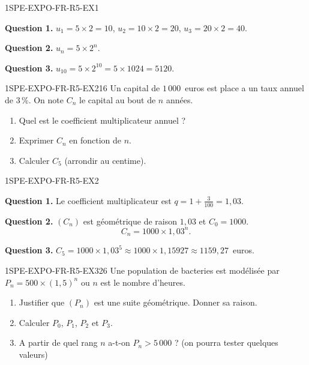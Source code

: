 \begin{corrige}{1SPE-EXPO-FR-R5-EX1}

\textbf{Question 1.}
$u_1 = 5 \times 2 = 10$, $u_2 = 10 \times 2 = 20$, $u_3 = 20 \times 2 = 40$.

\textbf{Question 2.}
$u_n = 5 \times 2^n$.

\textbf{Question 3.}
$u_{10} = 5 \times 2^{10} = 5 \times 1024 = 5120$.

\end{corrige}


\begin{exercice}{1SPE-EXPO-FR-R5-EX2}{1}{6}
Un capital de $1\,000$~euros est place a un taux annuel de $3\,\%$. On note $C_n$ le capital au bout de $n$ années.
\begin{enumerate}
  \item Quel est le coefficient multiplicateur annuel ?
  \item Exprimer $C_n$ en fonction de $n$.
  \item Calculer $C_5$ (arrondir au centime).
\end{enumerate}
\end{exercice}



\begin{corrige}{1SPE-EXPO-FR-R5-EX2}

\textbf{Question 1.} Le coefficient multiplicateur est $q = 1 + \frac{3}{100} = 1{,}03$.

\textbf{Question 2.} $(C_n)$ est géométrique de raison $1{,}03$ et $C_0 = 1000$.
\[
C_n = 1000 \times 1{,}03^n.
\]

\textbf{Question 3.}
$C_5 = 1000 \times 1{,}03^5 \approx 1000 \times 1{,}15927 \approx 1159{,}27$~euros.

\end{corrige}


\begin{exercice}{1SPE-EXPO-FR-R5-EX3}{2}{6}
Une population de bacteries est modélisée par $P_n = 500 \times (1{,}5)^n$ ou $n$ est le nombre d'heures.
\begin{enumerate}
  \item Justifier que $(P_n)$ est une suite géométrique. Donner sa raison.
  \item Calculer $P_0$, $P_1$, $P_2$ et $P_3$.
  \item A partir de quel rang $n$ a-t-on $P_n > 5\,000$ ? (on pourra tester quelques valeurs)
\end{enumerate}
\end{exercice}

